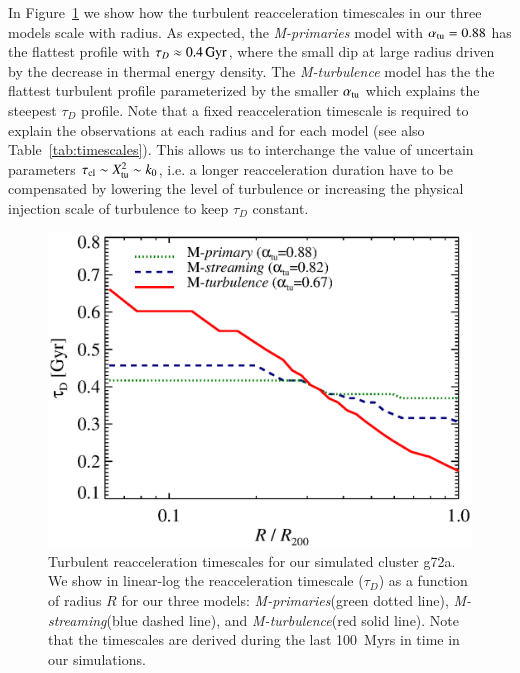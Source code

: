\documentclass[fleqn,usenatbib,useAMS]{mnras}
\newcommand{\Mstream}{{\it M-streaming}\xspace}
\newcommand{\Mflatturb}{{\it M-turbulence}\xspace}
\newcommand{\Mprimary}{{\it M-primaries}\xspace}
\begin{document}
In Figure~\ref{fig:tauD} we show how the turbulent reacceleration
timescales in our three models scale with radius. As expected, the
\Mprimary model with $\alpha_{\mathrm{tu}}=0.88$ has the flattest profile
with $\tau_D\approx0.4\,{\mathrm{Gyr}}$, where the small dip at large
radius driven by the decrease in thermal energy density. The
\Mflatturb model has the the flattest turbulent profile parameterized
by the smaller $\alpha_{\mathrm{tu}}$ which explains the steepest $\tau_D$
profile. Note that a fixed reacceleration timescale is required to
explain the observations at each radius and for each model (see also
Table~\ref{tab:timescales}). This allows us to interchange the value
of uncertain parameters $\tau_{\mathrm{cl}} \sim X_{\mathrm{tu}}^2 \sim k_0$,
i.e. a longer reacceleration duration have to be compensated by
lowering the level of turbulence or increasing the physical injection
scale of turbulence to keep $\tau_D$ constant.

\begin{figure}
  \includegraphics[width=1.0\columnwidth]{tau_reacc.eps}
  \caption{Turbulent reacceleration timescales for our simulated
    cluster g72a. We show in linear-log the reacceleration timescale
    ($\tau_D$) as a function of radius $R$ for our three models:
    \Mprimary (green dotted line), \Mstream (blue dashed line), and
    \Mflatturb (red solid line). Note that the timescales are derived
    during the last 100~Myrs in time in our simulations.}
  \label{fig:tauD}
\end{figure}


\end{document}
